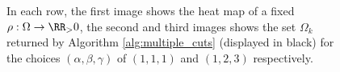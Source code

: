 \begin{figure}
\centering
{}\hspace{0mm}
\hspace{0mm}
\caption{
In each row, the first image shows the heat map of a fixed $\rho:\Omega\to\RR_>0$, the second and third images shows the set $\Omega_k$ returned by Algorithm \ref{alg:multiple_cuts} (displayed in black) for the choices $(\alpha,\beta,\gamma)$ of $(1,1,1)$ and $(1,2,3)$ respectively.
 }
\label{fig:alg}
\end{figure}


